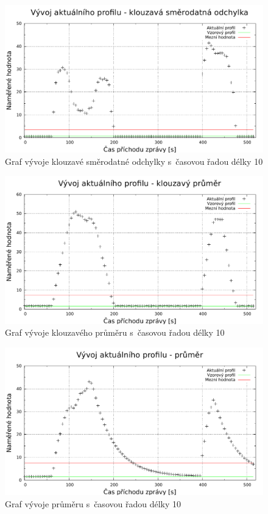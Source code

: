    \begin{figure}[ht]
   \begin{center}
   \includegraphics[scale=0.7]{pictures/moving_standard_deviation_progress}
   \caption{Graf vývoje klouzavé směrodatné odchylky s~časovou řadou délky 10}
   \label{obr.progressStandardDeviation}
   \end{center}
   \end{figure}
    
  \begin{figure}[ht]
   \begin{center}
   \includegraphics[scale=0.7]{pictures/moving_average_progress}
   \caption{Graf vývoje klouzavého průměru s~časovou řadou délky 10}
   \label{obr.progressAverage}
   \end{center}
   \end{figure}
   
   \begin{figure}[ht]
   \begin{center}
   \includegraphics[scale=0.7]{pictures/average_progress}
   \caption{Graf vývoje průměru s~časovou řadou délky 10}
   \label{obr.progressCumAverage}
   \end{center}
   \end{figure}
